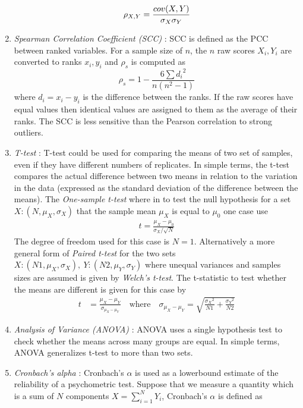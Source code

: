 \begin{enumerate}[leftmargin={0.5cm},topsep={0pt},itemsep={0pt},partopsep={0pt},parsep={0pt}]
\begin{equation}
\rho_{X,Y} = \frac{cov(X,Y)}{\sigma_X\sigma_Y} \\
\end{equation}
\item \emph{Spearman Correlation Coefficient (SCC)} : SCC is defined as the PCC between ranked variables. For a sample size of $n$, the $n$ raw scores $X_i,Y_i$ are converted to ranks $x_i,y_i$ and $\rho_s$ is computed as
\begin{equation}
\rho_s = 1-\frac{6\sum {d_i}^2}{n(n^2-1)} 
\end{equation}
where $d_i=x_i-y_i$ is the difference between the ranks. If the raw scores have equal values then identical values are assigned to them as the average of their ranks. The SCC is less sensitive than the Pearson correlation to strong outliers. 
\item \emph{T-test} : T-test could be used for comparing the means of two set of samples, even if they have different numbers of replicates. In simple terms, the t-test compares the actual difference between two means in relation to the variation in the data (expressed as the standard deviation of the difference between the means). The \emph{One-sample t-test} where in to test the null hypothesis for a set $X:(N,\mu_X,\sigma_X)$ that the sample mean $\mu_X$ is equal to $\mu_0$ one case use
\begin{align*}
t = \frac{\mu_X - \mu_0}{\sigma_X/\sqrt{N}}
\end{align*}
The degree of freedom used for this case is $N=1$. Alternatively a more general form of \emph{Paired t-test} for the two sets $X:(N1,\mu_X,\sigma_X),\ Y:(N2,\mu_Y,\sigma_Y)$ where unequal variances and samples sizes are assumed is given by \emph{Welch's t-test}. The t-statistic to test whether the means are different is given for this case by
\begin{align*}
t &= \frac{\mu_X-\mu_Y}{\sigma_{\mu_X-\mu_Y}} \quad \text{where} \quad \sigma_{\mu_X-\mu_Y} = \sqrt{\frac{{\sigma_X}^2}{N1}+\frac{{\sigma_Y}^2}{N2}} 
\end{align*}
\item \emph{Analysis of Variance (ANOVA)} : ANOVA uses a single hypothesis test to check whether the means across many groups are equal. In simple terms, ANOVA generalizes t-test to more than two sets.  
\item \emph{Cronbach's alpha} : Cronbach's $\alpha$ is used as a lowerbound estimate of the reliability of a psychometric test. Suppose that we measure a quantity which is a sum of $N$ components $X = \sum_{i=1}^{N} Y_i$, Cronbach's $\alpha$ is defined as 

\end{enumerate}
